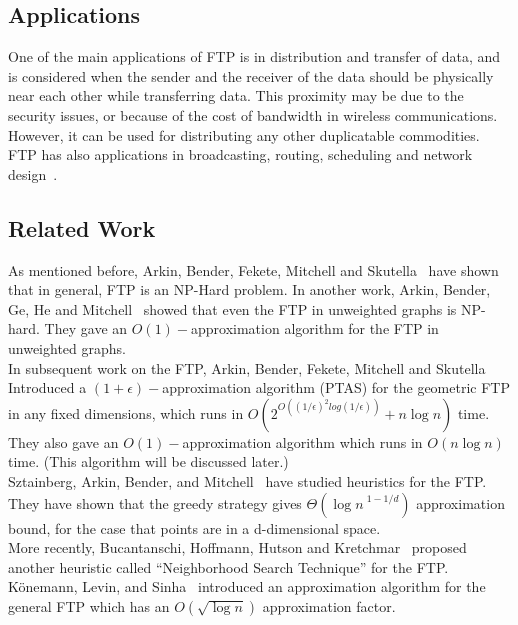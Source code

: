 \documentclass{cccg12}
\begin{document}
\subsection{Applications}
One of the main applications of FTP is in distribution and transfer of data, and is considered when the sender and the receiver of the data should be physically near each other while transferring data. This proximity may be due to the security issues, or because of the cost of bandwidth in wireless communications. However, it can be used for distributing any other duplicatable commodities. FTP has also applications in broadcasting, routing, scheduling and network design~\cite{Arkin2006}.

\subsection{Related Work}
As mentioned before, Arkin, Bender, Fekete, Mitchell and Skutella~\cite{Arkin2006} have shown that in general, FTP is an NP-Hard problem. In another work, Arkin, Bender, Ge, He and Mitchell~\cite{Arkin2003} showed that even the FTP in unweighted graphs is NP-hard. They gave an ${ O(1)- }$approximation algorithm for the FTP in unweighted graphs.\\
In subsequent work on the FTP, Arkin, Bender, Fekete, Mitchell and Skutella~\cite{Arkin2006} Introduced a  ${ (1+\epsilon)- }$approximation algorithm (PTAS) for the geometric FTP in any fixed dimensions, which runs in
${ O(2^{O((1/\epsilon)^2 log⁡(1/\epsilon))}+n\log n) }$
time. They also gave an ${ O(1)- }$approximation algorithm which runs in ${ O(n\log n) }$ time. (This algorithm will be discussed later.)\\
Sztainberg, Arkin, Bender, and Mitchell~\cite{sztainberg2004} have studied heuristics for the FTP. They have shown that the greedy strategy gives ${ \Theta({\log n~}^{1-1/d}) }$ approximation bound, for the case that points are in a d-dimensional space. \\
More recently, Bucantanschi, Hoffmann, Hutson and Kretchmar~\cite{Bucantanschi2007} proposed another heuristic called ``Neighborhood Search Technique'' for the  FTP.\\
Könemann, Levin, and Sinha~\cite{Konemann2004} introduced an approximation algorithm for the general FTP which has an ${ O(\sqrt{\log n}) }$ approximation factor.
\end{document}
